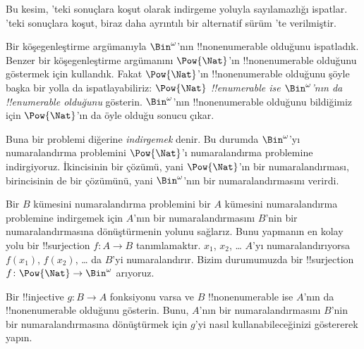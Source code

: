 



\begin{editorial}
  Bu kesim, 'teki sonuçlara koşut olarak indirgeme yoluyla
  sayılamazlığı ispatlar. 'teki sonuçlara koşut, biraz daha
  ayrıntılı bir alternatif sürüm 'te verilmiştir.
\end{editorial}

Bir köşegenleştirme argümanıyla $\Bin^\omega$'nın !!{nonenumerable}
olduğunu ispatladık. Benzer bir köşegenleştirme argümanını $\Pow{\Nat}$'ın
!!{nonenumerable} olduğunu göstermek için kullandık. Fakat $\Pow{\Nat}$'ın
!!{nonenumerable} olduğunu şöyle başka bir yolla da ispatlayabiliriz:
\emph{$\Pow{\Nat}$ !!{enumerable} ise $\Bin^\omega$'nın da !!{enumerable}
olduğunu} gösterin. $\Bin^\omega$'nın !!{nonenumerable} olduğunu bildiğimiz
için $\Pow{\Nat}$'ın da öyle olduğu sonucu çıkar.

Buna bir problemi diğerine \emph{indirgemek} denir. Bu durumda
$\Bin^\omega$'yı numaralandırma problemini $\Pow{\Nat}$'ı numaralandırma
problemine indirgiyoruz. İkincisinin bir çözümü, yani $\Pow{\Nat}$'ın bir
numaralandırması, birincisinin de bir çözümünü, yani $\Bin^\omega$'nın bir
numaralandırmasını verirdi.

Bir $B$ kümesini numaralandırma problemini bir $A$ kümesini numaralandırma
problemine indirgemek için $A$'nın bir numaralandırmasını $B$'nin bir
numaralandırmasına dönüştürmenin yolunu sağlarız. Bunu yapmanın en kolay yolu
bir !!{surjection} $f\colon A\to B$ tanımlamaktır. $x_1$, $x_2$, \dots{}
$A$'yı numaralandırıyorsa $f(x_1)$, $f(x_2)$, \dots{} da $B$'yi
numaralandırır. Bizim durumumuzda bir !!{surjection}
$f\colon\Pow{\Nat}\to\Bin^\omega$ arıyoruz.

\begin{prob}
Bir !!{injective} $g\colon B\to A$ fonksiyonu varsa ve $B$
!!{nonenumerable} ise $A$'nın da !!{nonenumerable} olduğunu gösterin. Bunu,
$A$'nın bir numaralandırmasını $B$'nin bir numaralandırmasına dönüştürmek
için $g$'yi nasıl kullanabileceğinizi göstererek yapın.
\end{prob}

